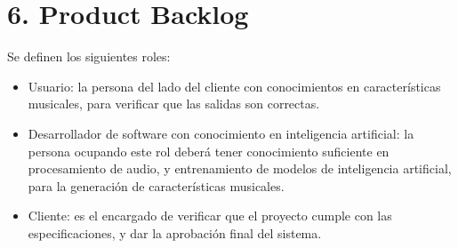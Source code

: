\documentclass[
11pt, %
]{charter}
\begin{document}

\section{6. Product Backlog}
\label{sec:backlog}








Se definen los siguientes roles:

\begin{itemize}
	\item Usuario: la persona del lado del cliente con conocimientos en características musicales, para verificar que las salidas son correctas.
	\item Desarrollador de software con conocimiento en inteligencia artificial: la persona ocupando este rol deberá tener conocimiento suficiente en procesamiento de audio, y entrenamiento de modelos de inteligencia artificial, para la generación de características musicales.
	\item Cliente: es el encargado de verificar que el proyecto cumple con las especificaciones, y dar la aprobación final del sistema.
\end{itemize}
\end{document}
